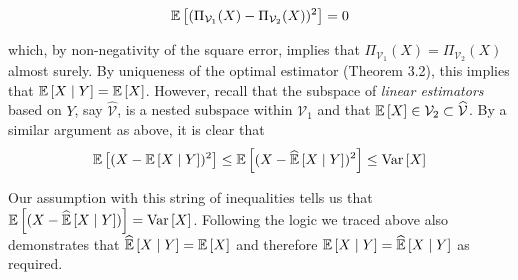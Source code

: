 \documentclass[12pt]{article}%
\begin{document}
\begin{enumerate}
  \[\mathbb{E}\left[(\Pi_{\mathcal{V}_1}(X) - \Pi_{\mathcal{V}_2}(X))^2\right] = 0 \]

  which, by non-negativity of the square error, implies that $\Pi_{\mathcal{V}_1}(X) = \Pi_{\mathcal{V}_2}(X)$ almost surely. By uniqueness of the optimal estimator (Theorem 3.2), this implies that $\mathbb{E}\left[{X}\mid {Y}\right] = \mathbb{E}\left[X\right]$. However, recall that the subspace of \emph{linear estimators} based on $Y$, say $\widehat{\mathcal{V}}$, is a nested subspace within $\mathcal{V}_1$ and that $\mathbb{E}\left[X\right] \in \mathcal{V}_2 \subset \widehat{\mathcal{V}}$. By a similar argument as above, it is clear that
  $$ \mathbb{E}\left[(X - \mathbb{E}\left[{X}\mid {Y}\right])^2\right] \leq \mathbb{E}\left[(X - \widehat{ \mathbb{E}}\left[{X} \mid {Y}\right])^2\right] \leq \text{Var}\left[X\right]$$

   Our assumption with this string of inequalities tells us that $\mathbb{E}\left[(X - \widehat{ \mathbb{E}}\left[{X} \mid {Y}\right])\right] = \text{Var}\left[X\right]$. Following the logic we traced above also demonstrates that $\widehat{ \mathbb{E}}\left[{X} \mid {Y}\right] = \mathbb{E}\left[X\right]$ and therefore $\mathbb{E}\left[{X}\mid {Y}\right] = \widehat{ \mathbb{E}}\left[{X} \mid {Y}\right]$ as required.
\end{enumerate}
\end{document}
